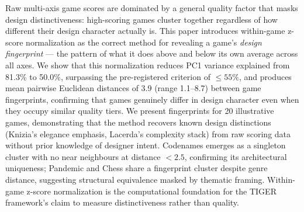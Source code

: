 Raw multi-axis game scores are dominated by a general quality factor that masks design
distinctiveness: high-scoring games cluster together regardless of how different their
design character actually is. This paper introduces within-game z-score normalization as
the correct method for revealing a game's \emph{design fingerprint} --- the pattern of
what it does above and below its own average across all axes. We show that this
normalization reduces PC1 variance explained from 81.3\% to 50.0\%, surpassing the
pre-registered criterion of $\leq 55\%$, and produces mean pairwise Euclidean distances
of 3.9 (range 1.1--8.7) between game fingerprints, confirming that games genuinely
differ in design character even when they occupy similar quality tiers. We present
fingerprints for 20 illustrative games, demonstrating that the method recovers known
design distinctions (Knizia's elegance emphasis, Lacerda's complexity stack) from
raw scoring data without prior knowledge of designer intent. Codenames emerges as a
singleton cluster with no near neighbours at distance $< 2.5$, confirming its
architectural uniqueness; Pandemic and Chess share a fingerprint cluster despite genre
distance, suggesting structural equivalence masked by thematic framing. Within-game
z-score normalization is the computational foundation for the TIGER framework's claim
to measure distinctiveness rather than quality.

